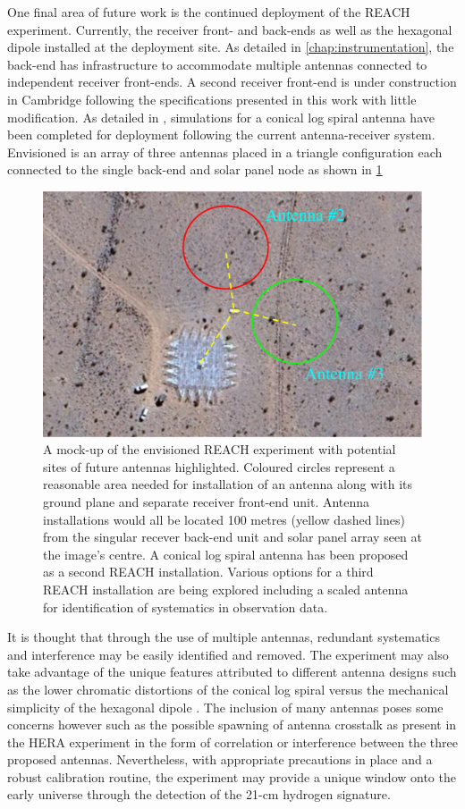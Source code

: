 One final area of future work is the continued deployment of the REACH experiment. Currently, the receiver front- and back-ends as well as the hexagonal dipole installed at the deployment site. As detailed in \cref{chap:instrumentation}, the back-end has infrastructure to accommodate multiple antennas connected to independent receiver front-ends. A second receiver front-end is under construction in Cambridge following the specifications presented in this work with little modification. As detailed in \citet{reach}, simulations for a conical log spiral antenna have been completed for deployment following the current antenna-receiver system. Envisioned is an array of three antennas placed in a triangle configuration each connected to the single back-end and solar panel node as shown in \cref{fig:reach_prime}
\begin{figure}
    \centering
    \includegraphics[width=.7\textwidth]{reach_prime}
    \caption{A mock-up of the envisioned REACH experiment with potential sites of future antennas highlighted. Coloured circles represent a reasonable area needed for installation of an antenna along with its ground plane and separate receiver front-end unit. Antenna installations would all be located 100 metres (yellow dashed lines) from the singular recever back-end unit and solar panel array seen at the image's centre. A conical log spiral antenna has been proposed as a second REACH installation. Various options for a third REACH installation are being explored including a scaled antenna for identification of systematics in observation data.}
    \label{fig:reach_prime}
\end{figure}
It is thought that through the use of multiple antennas, redundant systematics and interference may be easily identified and removed. The experiment may also take advantage of the unique features attributed to different antenna designs such as the lower chromatic distortions of the conical log spiral versus the mechanical simplicity of the hexagonal dipole \citep{dom_antenna,john_antenna,reach}. The inclusion of many antennas poses some concerns however such as the possible spawning of antenna crosstalk as present in the HERA experiment \citep{hera_crosstalk} in the form of correlation or interference between the three proposed antennas. Nevertheless, with appropriate precautions in place and a robust calibration routine, the experiment may provide a unique window onto the early universe through the detection of the 21-cm hydrogen signature.

